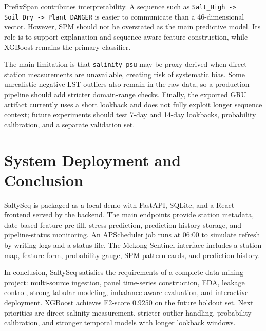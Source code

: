 \documentclass[a4paper, 11pt]{article}
\begin{document}
PrefixSpan contributes interpretability. A sequence such as \texttt{Salt\_High -> Soil\_Dry -> Plant\_DANGER} is easier to communicate than a 46-dimensional vector. However, SPM should not be overstated as the main predictive model. Its role is to support explanation and sequence-aware feature construction, while XGBoost remains the primary classifier.

The main limitation is that \texttt{salinity\_psu} may be proxy-derived when direct station measurements are unavailable, creating risk of systematic bias. Some unrealistic negative LST outliers also remain in the raw data, so a production pipeline should add stricter domain-range checks. Finally, the exported GRU artifact currently uses a short lookback and does not fully exploit longer sequence context; future experiments should test 7-day and 14-day lookbacks, probability calibration, and a separate validation set.

\section{System Deployment and Conclusion}

SaltySeq is packaged as a local demo with FastAPI, SQLite, and a React frontend served by the backend. The main endpoints provide station metadata, date-based feature pre-fill, stress prediction, prediction-history storage, and pipeline-status monitoring. An APScheduler job runs at 06:00 to simulate refresh by writing logs and a status file. The Mekong Sentinel interface includes a station map, feature form, probability gauge, SPM pattern cards, and prediction history.

In conclusion, SaltySeq satisfies the requirements of a complete data-mining project: multi-source ingestion, panel time-series construction, EDA, leakage control, strong tabular modeling, imbalance-aware evaluation, and interactive deployment. XGBoost achieves F2-score 0.9250 on the future holdout set. Next priorities are direct salinity measurement, stricter outlier handling, probability calibration, and stronger temporal models with longer lookback windows.
\end{document}
